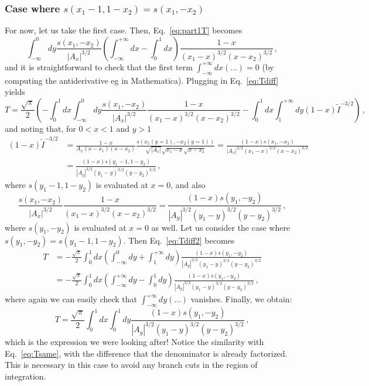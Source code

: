 \documentclass[twoside]{article}
\begin{document}
\subsubsection{Case where $s(x_1-1,1-x_2)=s(x_1,-x_2)$}
\label{sec:same}

For now, let us take the first case. Then, Eq.~\eqref{eq:part1T} becomes
\begin{equation}
\label{eq:sames}
\int_{-\infty}^0 dy \frac{s(x_1,-x_2)}{|A_x|^{3/2}} \left(\int_{-\infty}^{+\infty} dx 
- \int_{0}^1 dx \right) \frac{1-x}{(x_1-x)^{3/2}(x-x_2)^{3/2}}\,,
\end{equation}
and it is straightforward to check that the first term $\int_{-\infty}^{+\infty} dx (\ldots)=0$ (by computing the antiderivative eg in Mathematica).
Plugging in Eq.~\eqref{eq:Tdiff} yields
\begin{equation}
\label{eq:Tdiff2}
T =  \frac{\sqrt{\pi}}{2}\left(-\int_0^1 dx \int_{-\infty}^0 dy \frac{s(x_1,-x_2)}{|A_x|^{3/2}} \frac{1-x}{(x_1-x)^{3/2}(x-x_2)^{3/2}}
-\int_0^1 dx \int_{1}^{+\infty}dy
(1-x)\tilde{I}^{-3/2}\right) \,, 
\end{equation}
and noting that, for $0<x<1$ and $y>1$
\begin{equation}
\begin{split}
(1-x)\tilde{I}^{-3/2} &= \frac{1-x}{A_x (x-x_1)(x-x_2)}\frac{s(x_1(y=1),-x_2(y=1))}{\sqrt{|A_x|}\sqrt{x_1-x}\sqrt{x-x_2}} = \frac{(1-x)s(x_1,-x_2)}{|A_x|^{3/2} (x_1-x)^{3/2}(x-x_2)^{3/2}}\\
&=\frac{(1-x)s(y_1-1,1-y_2)}{|A_y|^{3/2} (y_1-y)^{3/2}(y-y_2)^{3/2}}\,,
\end{split}
\end{equation}
where $s(y_1-1,1-y_2)$ is evaluated at $x=0$,
and also
\begin{equation}
\frac{s(x_1,-x_2)}{|A_x|^{3/2}} \frac{1-x}{(x_1-x)^{3/2}(x-x_2)^{3/2}} = \frac{(1-x)s(y_1,-y_2)}{|A_y|^{3/2} (y_1-y)^{3/2}(y-y_2)^{3/2}}\,,
\end{equation}
where $s(y_1,-y_2)$ is evaluated at $x=0$ as well.
Let us consider the case where $s(y_1,-y_2) = s(y_1-1,1-y_2)$. Then Eq.~\eqref{eq:Tdiff2} becomes
\begin{equation}
\begin{split}
T&=-\frac{\sqrt{\pi}}{2}\int_0^1 dx \left(\int_{-\infty}^0 dy + \int_{1}^{+\infty}dy\right)
\frac{(1-x)s(y_1,-y_2)}{|A_y|^{3/2} (y_1-y)^{3/2}(y-y_2)^{3/2}}\\
&= -\frac{\sqrt{\pi}}{2}\int_0^1 dx \left(\int_{-\infty}^{+\infty} dy - \int_{0}^1dy\right)
\frac{(1-x)s(y_1,-y_2)}{|A_y|^{3/2} (y_1-y)^{3/2}(y-y_2)^{3/2}}\,,
\end{split}
\end{equation}
where again we can easily check that $\int_{-\infty}^{+\infty} dy (\ldots)$ vanishes. Finally, we obtain:
\begin{equation}
\label{eq:Tfinal}
T = \frac{\sqrt{\pi}}{2}\int_0^1 dx \int_{0}^1dy \frac{(1-x)s(y_1,-y_2)}{|A_y|^{3/2} (y_1-y)^{3/2}(y-y_2)^{3/2}}\,,
\end{equation}
which is the expression we were looking after! Notice the similarity with Eq.~\eqref{eq:Tsame}, with the difference that the denominator is already factorized. This is necessary in this case to avoid any branch cuts in the region of integration.
\end{document}

